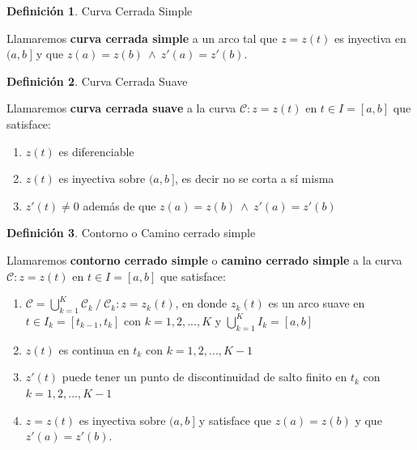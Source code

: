 \documentclass[12pt]{article}
\theoremstyle{definition}
\newtheorem{definition}{Definici\'on}[section]
\theoremstyle{theorem}
\theoremstyle{corolary}
\begin{document}
\colorbox{orange!40!white!80}{\parbox{\linewidth}{
\theoremstyle{definition}
\begin{definition}{Curva Cerrada Simple}

Llamaremos \textbf{curva cerrada simple} a un arco tal que $z=z(t)$ es inyectiva en $(a, b\ ]$ y que $z(a)=z(b)\:\land\:z'(a)=z'(b)$.
\end{definition}}}
\linebreak
\linebreak

\colorbox{orange!40!white!80}{\parbox{\linewidth}{
\theoremstyle{definition}
\begin{definition}{Curva Cerrada Suave}

Llamaremos \textbf{curva cerrada suave} a la curva $\mathcal{C}: z=z(t)$ en $t\in I = [a,b]$ que satisface:
\begin{enumerate}
	\item $z(t)$ es diferenciable
	\item $z(t)$ es inyectiva sobre $(a, b\ ]$, es decir no se corta a s\'i misma
	\item $z'(t)\neq 0$ adem\'as de que $z(a)=z(b)\:\land\:z'(a)=z'(b)$
\end{enumerate}
\end{definition}}}
\linebreak
\linebreak

\colorbox{orange!40!white!80}{\parbox{\linewidth}{
\theoremstyle{definition}
\begin{definition}{Contorno o Camino cerrado simple}

Llamaremos \textbf{contorno cerrado simple} o \textbf{camino cerrado simple} a la curva $\mathcal{C}: z=z(t)$ en $t\in I = [a,b]$ que satisface:
\begin{enumerate}
	\item $\mathcal{C} = \bigcup\limits_{k=1}^K \mathcal{C}_k\ /\ \mathcal{C}_k:z = z_k(t)$, en donde $z_k(t)$ es un arco suave en $t\in I_k = [t_{k-1}, t_k]$ con $k=1, 2, ..., K$ y $\bigcup\limits_{k=1}^K I_k = [a, b]$ 
	\item $z(t)$ es continua en $t_k$ con $k=1, 2,..., K-1$
	\item $z'(t)$ puede tener un punto de discontinuidad de salto finito en $t_k$ con $k=1, 2,..., K-1$
	\item $z=z(t)$ es inyectiva sobre $(a, b\ ]$ y satisface que $z(a)=z(b)$ y que $z'(a)=z'(b)$.
\end{enumerate}
\end{definition}}}
\linebreak
\end{document}
